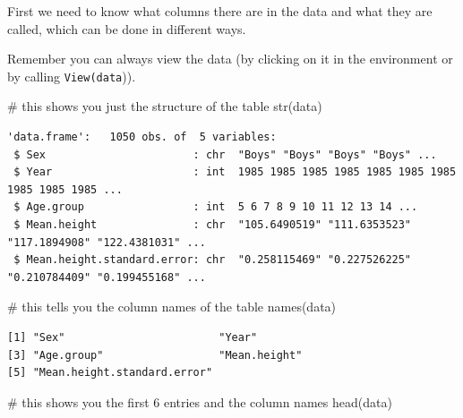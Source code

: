 \documentclass[
  letterpaper,
  DIV=11,
  numbers=noendperiod]{scrreprt}
\newenvironment{Shaded}{}{}
\newcommand{\CommentTok}[1]{\textcolor[rgb]{0.42,0.45,0.49}{#1}}
\newcommand{\FunctionTok}[1]{\textcolor[rgb]{0.44,0.26,0.76}{#1}}
\newcommand{\NormalTok}[1]{\textcolor[rgb]{0.14,0.16,0.18}{#1}}
\begin{document}
\begin{tcolorbox}[enhanced jigsaw, arc=.35mm, left=2mm, titlerule=0mm, rightrule=.15mm, colframe=quarto-callout-tip-color-frame, coltitle=black, colback=white, opacityback=0, bottomtitle=1mm, bottomrule=.15mm, colbacktitle=quarto-callout-tip-color!10!white, breakable, title=\textcolor{quarto-callout-tip-color}{\faLightbulb}\hspace{0.5em}{Code and answer}, toptitle=1mm, toprule=.15mm, opacitybacktitle=0.6, leftrule=.75mm]

First we need to know what columns there are in the data and what they
are called, which can be done in different ways.

Remember you can always view the data (by clicking on it in the
environment or by calling \texttt{View(data})).

\begin{Shaded}
\begin{Highlighting}[]
\CommentTok{\# this shows you just the structure of the table}
\FunctionTok{str}\NormalTok{(data) }
\end{Highlighting}
\end{Shaded}

\begin{verbatim}
'data.frame':   1050 obs. of  5 variables:
 $ Sex                       : chr  "Boys" "Boys" "Boys" "Boys" ...
 $ Year                      : int  1985 1985 1985 1985 1985 1985 1985 1985 1985 1985 ...
 $ Age.group                 : int  5 6 7 8 9 10 11 12 13 14 ...
 $ Mean.height               : chr  "105.6490519" "111.6353523" "117.1894908" "122.4381031" ...
 $ Mean.height.standard.error: chr  "0.258115469" "0.227526225" "0.210784409" "0.199455168" ...
\end{verbatim}

\begin{Shaded}
\begin{Highlighting}[]
\CommentTok{\# this tells you the column names of the table}
\FunctionTok{names}\NormalTok{(data) }
\end{Highlighting}
\end{Shaded}

\begin{verbatim}
[1] "Sex"                        "Year"                      
[3] "Age.group"                  "Mean.height"               
[5] "Mean.height.standard.error"
\end{verbatim}

\begin{Shaded}
\begin{Highlighting}[]
\CommentTok{\# this shows you the first 6 entries and the column names}
\FunctionTok{head}\NormalTok{(data) }
\end{Highlighting}
\end{Shaded}


\end{tcolorbox}
\end{document}
